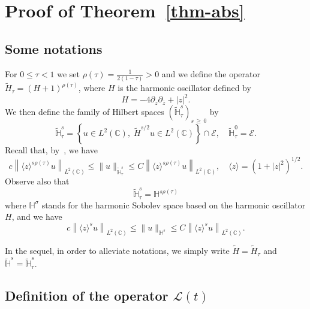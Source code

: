 \documentclass[AHL,Unicode,published]{cedram}
\newcommand{\C}{\mathbb{C}}
\newcommand{\HH}{\mathbb{H}}
\newcommand{\E}{\mathcal{E}}
\renewcommand{\L}{\mathscr{L}}
\newcommand{\ov}{\overline}
\newcommand{\wt}{\widetilde}
\newcommand{\<}{\langle}
\renewcommand{\>}{\rangle}
\begin{document}
\section{Proof of Theorem~\ref{thm-abs}} \label{Sect4}


\subsection{Some notations}

For $0\leq \tau <1$ we set $\rho(\tau)=\frac1{2(1-\tau)}>0$ and we define the operator $\wt{H}_\tau=(H+1)^{\rho(\tau)}$, where $H$ is the harmonic oscillator defined by
\[
H = -4\partial_z \partial_{\ov z}+|z|^2.
\]
We then define the family of Hilbert spaces $(\widetilde{\HH}_\tau^{s})_{s\,\geq\,0}$ by
\[
\widetilde{\HH}_\tau^{s} = \left\{ u\in L^2(\C),\; \wt{H}^{s/2}u\in L^2(\C)\right\} \cap \E,\quad \widetilde{\HH}_\tau^{0} =\E.
\]
Recall that, by~\cite[Lemma~C.1]{GGT}, we have
\[
c \left\|\<z\>^{s\rho(\tau)} u\right\|_{L^2(\C)} \leq \|u\|_{\wt{\HH}_\tau^s} \leq C\left\|\<z\>^{s\rho(\tau)} u\right\|_{L^2(\C)}, \quad \<z\>=\left(1+|z|^2\right)^{1/2}.
\]
Observe also that
\begin{equation}\label{eq-hs}
\widetilde{\HH}_\tau^{s} = {\HH}^{s \rho(\tau)}
\end{equation}
where ${\HH}^{\sigma}$ stands for the harmonic Sobolev space based on the harmonic oscillator $H$, and we have
\begin{equation}\label{eq-hs1}
c\left\|\<z\>^{s} u\right\|_{L^2(\C)} \leq \|u\|_{{\HH}^s} \leq C\left\|\<z\>^{s} u\right\|_{L^2(\C)}.
\end{equation}

In the sequel, in order to alleviate notations, we simply write $\wt{H}=
\wt{H}_\tau$ and $\widetilde{\HH}^{s} = \widetilde{\HH}_\tau^{s}$.


\subsection{Definition of the operator \texorpdfstring{$ \L(t)$}{mathscrL(t)}}
\end{document}
